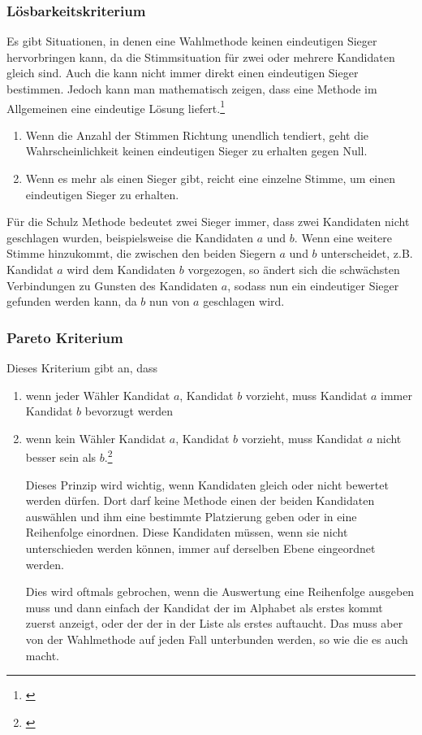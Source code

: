 \subsubsection{Lösbarkeitskriterium} 
\label{sec:loesbarkeitsKriterium}
Es gibt Situationen, in denen eine Wahlmethode keinen eindeutigen Sieger hervorbringen kann, da die Stimmsituation für zwei oder mehrere Kandidaten gleich sind. Auch die \schulze kann nicht immer direkt einen eindeutigen Sieger bestimmen. Jedoch kann man mathematisch zeigen, dass eine Methode im Allgemeinen eine eindeutige Lösung liefert.\footnote{\Vgl \citet{Schulze2017}}
\begin{enumerate}
\item Wenn die Anzahl der Stimmen Richtung unendlich tendiert, geht die Wahrscheinlichkeit keinen eindeutigen Sieger zu erhalten gegen Null.
\item Wenn es mehr als einen Sieger gibt, reicht eine einzelne Stimme, um einen eindeutigen Sieger zu erhalten.
\end{enumerate}

Für die Schulz Methode bedeutet zwei Sieger immer, dass zwei Kandidaten nicht geschlagen wurden, beispielsweise die Kandidaten $a$ und $b$. Wenn eine weitere Stimme hinzukommt, die zwischen den beiden Siegern $a$ und $b$ unterscheidet, z.B. Kandidat $a$ wird dem Kandidaten $b$ vorgezogen, so ändert sich die schwächsten Verbindungen zu Gunsten des Kandidaten $a$, sodass nun ein eindeutiger Sieger gefunden werden kann, da $b$ nun von $a$ geschlagen wird.


\subsubsection{Pareto Kriterium} 
\label{sec:paretoKriterium}
Dieses Kriterium gibt an, dass
\begin{enumerate}
\item wenn jeder Wähler Kandidat $a$, Kandidat $b$ vorzieht, muss Kandidat $a$ immer Kandidat $b$ bevorzugt werden
\item wenn kein Wähler Kandidat $a$, Kandidat $b$ vorzieht, muss Kandidat $a$ nicht besser sein als $b$.\footnote{\Vgl \citet{Schulze2017}}

Dieses Prinzip wird wichtig, wenn Kandidaten gleich oder nicht bewertet werden dürfen. Dort darf keine Methode einen der beiden Kandidaten auswählen und ihm eine bestimmte Platzierung geben oder in eine Reihenfolge einordnen. Diese Kandidaten müssen, wenn sie nicht unterschieden werden können, immer auf derselben Ebene eingeordnet werden. 

Dies wird oftmals gebrochen, wenn die Auswertung eine Reihenfolge ausgeben muss und dann einfach der Kandidat der im Alphabet als erstes kommt zuerst anzeigt, oder der der in der Liste als erstes auftaucht. Das muss aber von der Wahlmethode auf jeden Fall unterbunden werden, so wie die \schulze es auch macht. 
\end{enumerate}

